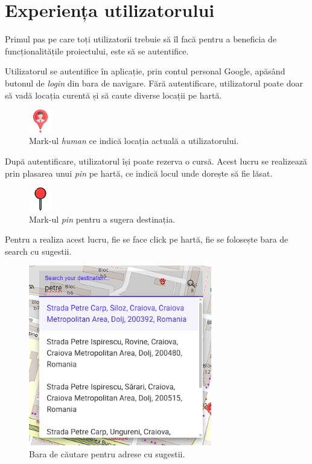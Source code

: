 \section{Experiența utilizatorului}

Primul pas pe care toți utilizatorii trebuie să îl facă pentru a beneficia de funcționalitățile proiectului, este să 
se autentifice.

Utilizatorul se autentifice în aplicație, prin contul personal Google, apăsând butonul de \textit{login} din bara de navigare. 
Fără autentificare, utilizatorul poate doar să vadă locația curentă și să
caute diverse locații pe hartă.

\begin{figure}[H]
    \centering
    \includegraphics[width=1cm]{Assets/human.png}
    \caption{Mark-ul \textit{human} ce indică locația actuală a utilizatorului.}
    \label{fig:humanMark}
\end{figure}

După autentificare, utilizatorul își poate rezerva o cursă. Acest lucru se realizează prin
plasarea unui \textit{pin} pe hartă, ce indică locul unde dorește să fie lăsat.

\begin{figure}[H]
    \centering
    \includegraphics[width=1cm]{Assets/pin.png}
    \caption{Mark-ul \textit{pin} pentru a sugera destinația.}
    \label{fig:pinMark}
\end{figure}

Pentru a realiza acest lucru, fie se face click pe hartă, fie se folosește bara de search cu sugestii.

\begin{figure}[H]
    \centering
    \includegraphics[width=8cm]{Assets/search.png}
    \caption{Bara de căutare pentru adrese cu sugestii.}
    \label{fig:searchAddress}
\end{figure}

